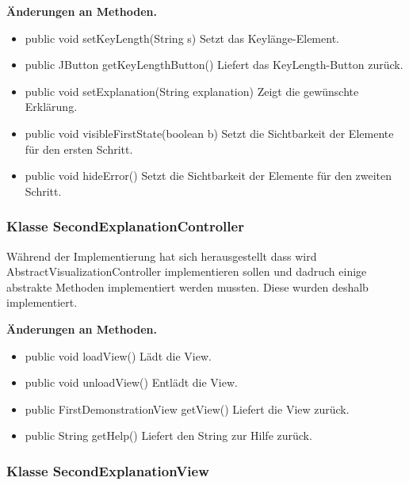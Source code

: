 \documentclass{article}
\begin{document}
    \textbf{Änderungen an Methoden.}
      \begin{itemize}
		\item public void setKeyLength(String s)\newline
              Setzt das Keylänge-Element.
		\item public JButton getKeyLengthButton()\newline
              Liefert das KeyLength-Button zurück.
		\item public void setExplanation(String explanation)\newline
              Zeigt die gewünschte Erklärung.
		\item public void visibleFirstState(boolean b)\newline
              Setzt die Sichtbarkeit der Elemente für den ersten Schritt.
		\item public void hideError()\newline
              Setzt die Sichtbarkeit der Elemente für den zweiten Schritt.	
	  \end{itemize}
	  
    \subsubsection{Klasse SecondExplanationController}
	Während der Implementierung hat sich herausgestellt dass wird AbstractVisualizationController implementieren sollen und dadruch 
	einige abstrakte Methoden implementiert werden mussten. Diese wurden deshalb implementiert.\newline
           
    \textbf{Änderungen an Methoden.}
      \begin{itemize}
		\item public void loadView()\newline
              Lädt die View.
        \item public void unloadView()\newline
              Entlädt die View.
        \item public FirstDemonstrationView getView()\newline
              Liefert die View zurück.
        \item public String getHelp()\newline
              Liefert den String zur Hilfe zurück.
      \end{itemize}
	  
    \subsubsection{Klasse SecondExplanationView}
\end{document}
